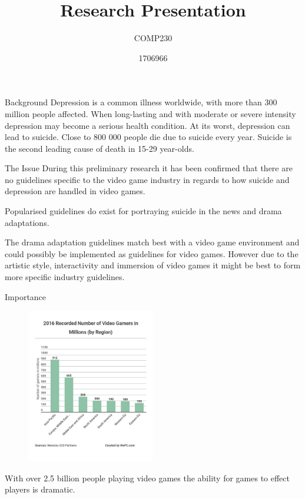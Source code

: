 \documentclass{beamer}
\title{Research Presentation}
\subtitle{COMP230}
\author{1706966}
\begin{document}
\begin{frame}
	\maketitle
\end{frame}

\begin{frame}{Background}
	Depression is a common illness worldwide, with more than 300 million people affected. When long-lasting and with moderate or severe intensity depression may become a serious health condition. At its worst, depression can lead to suicide. Close to 800 000 people die due to suicide every year. Suicide is the second leading cause of death in 15-29 year-olds\cite{DepressionStats}.
\end{frame}

\begin{frame}{The Issue}
	During this preliminary research it has been confirmed that there are no guidelines specific to the video game industry in regards to how suicide and depression are handled in video games.\vspace{5mm} %
	
	Popularised guidelines do exist for portraying suicide in the news\cite{world2017preventing}\cite{nepon2009media} and drama adaptations\cite{DramaGuidelines}. \vspace{5mm} %
	
	The drama adaptation guidelines match best with a video game environment and could possibly be implemented as guidelines for video games. However due to the artistic style, interactivity and immersion of video games it might be best to form more specific industry guidelines.   
\end{frame}

\begin{frame}{Importance}
	\begin{figure} %
		\centering
		\includegraphics[width=0.5\textwidth]{numberOfGamers}
	\end{figure}
	With over 2.5 billion people playing video games the ability for games to effect players is dramatic. 
\end{frame}
\end{document}
